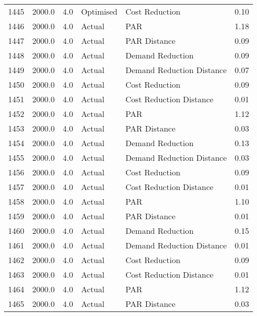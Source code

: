 \begin{longtable}{lrrllr}
1445 &       2000.0 &     4.0 &      Optimised &             Cost Reduction &   0.10 \\
1446 &       2000.0 &     4.0 &         Actual &                        PAR &   1.18 \\
1447 &       2000.0 &     4.0 &         Actual &               PAR Distance &   0.09 \\
1448 &       2000.0 &     4.0 &         Actual &           Demand Reduction &   0.09 \\
1449 &       2000.0 &     4.0 &         Actual &  Demand Reduction Distance &   0.07 \\
1450 &       2000.0 &     4.0 &         Actual &             Cost Reduction &   0.09 \\
1451 &       2000.0 &     4.0 &         Actual &    Cost Reduction Distance &   0.01 \\
1452 &       2000.0 &     4.0 &         Actual &                        PAR &   1.12 \\
1453 &       2000.0 &     4.0 &         Actual &               PAR Distance &   0.03 \\
1454 &       2000.0 &     4.0 &         Actual &           Demand Reduction &   0.13 \\
1455 &       2000.0 &     4.0 &         Actual &  Demand Reduction Distance &   0.03 \\
1456 &       2000.0 &     4.0 &         Actual &             Cost Reduction &   0.09 \\
1457 &       2000.0 &     4.0 &         Actual &    Cost Reduction Distance &   0.01 \\
1458 &       2000.0 &     4.0 &         Actual &                        PAR &   1.10 \\
1459 &       2000.0 &     4.0 &         Actual &               PAR Distance &   0.01 \\
1460 &       2000.0 &     4.0 &         Actual &           Demand Reduction &   0.15 \\
1461 &       2000.0 &     4.0 &         Actual &  Demand Reduction Distance &   0.01 \\
1462 &       2000.0 &     4.0 &         Actual &             Cost Reduction &   0.09 \\
1463 &       2000.0 &     4.0 &         Actual &    Cost Reduction Distance &   0.01 \\
1464 &       2000.0 &     4.0 &         Actual &                        PAR &   1.12 \\
1465 &       2000.0 &     4.0 &         Actual &               PAR Distance &   0.03 \\

\end{longtable}
